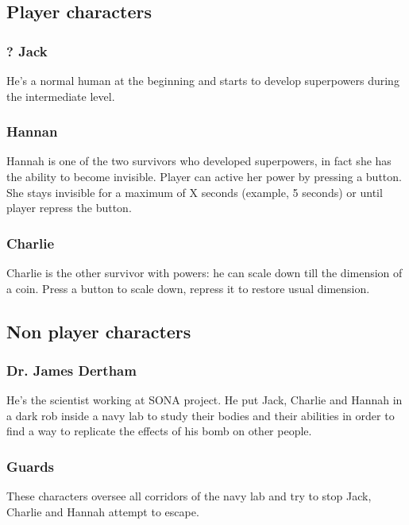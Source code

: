 \subsection{Player characters}
\subsubsection {? Jack}
He's a normal human at the beginning and starts to develop superpowers during the intermediate level.

\subsubsection {Hannan}
Hannah is one of the two survivors who developed superpowers, in fact she has the ability to become invisible. Player can active her power by pressing a button. She stays invisible for a maximum of X seconds (example, 5 seconds) or until player repress the button.

\subsubsection {Charlie}
Charlie is the other survivor with powers: he can scale down till the dimension of a coin. Press a button to scale down, repress it to restore usual dimension.

\subsection{Non player characters}
\subsubsection {Dr. James Dertham}
He's the scientist working at SONA project. He put Jack, Charlie and Hannah in a dark rob inside a navy lab to study their bodies and their abilities in order to find a way to replicate the effects of his bomb on other people.

\subsubsection {Guards}
These characters oversee all corridors of the navy lab and try to stop Jack, Charlie and Hannah attempt to escape.